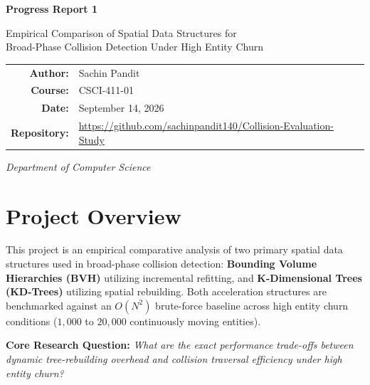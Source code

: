 \documentclass[12pt]{article}
\begin{document}
\begin{titlepage}
    \centering
    \vspace*{2cm}

    {\LARGE\bfseries Progress Report 1\par}
    \vspace{0.5cm}
    {\large Empirical Comparison of Spatial Data Structures for\\
    Broad-Phase Collision Detection Under High Entity Churn\par}

    \vspace{2cm}

    \begin{tabular}{rl}
        \textbf{Author:}     & Sachin Pandit \\[6pt]
        \textbf{Course:}     & CSCI-411-01   \\[6pt]
        \textbf{Date:}       & September 14, 2026 \\[6pt]
        \textbf{Repository:} & \url{https://github.com/sachinpandit140/Collision-Evaluation-Study} \\
    \end{tabular}

    \vfill

    \textit{Department of Computer Science}

\end{titlepage}


\section{Project Overview}

This project is an empirical comparative analysis of two primary spatial data structures used in broad-phase collision detection: \textbf{Bounding Volume Hierarchies (BVH)} utilizing incremental refitting, and \textbf{K-Dimensional Trees (KD-Trees)} utilizing spatial rebuilding. Both acceleration structures are benchmarked against an $O(N^2)$ brute-force baseline across high entity churn conditions ($1{,}000$ to $20{,}000$ continuously moving entities).

\textbf{Core Research Question:} \textit{What are the exact performance trade-offs between dynamic tree-rebuilding overhead and collision traversal efficiency under high entity churn?} 
\end{document}
